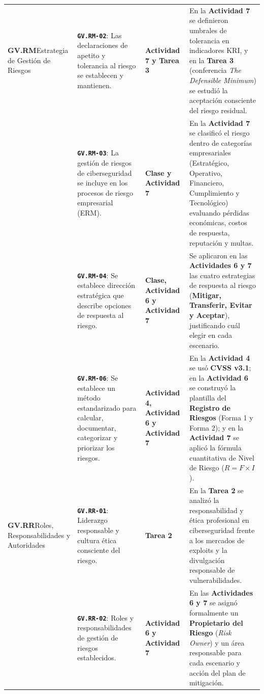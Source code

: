 \documentclass[letterpaper,11pt]{article}
\begin{document}
\begin{longtable}{|L{2.8cm}|L{4.5cm}|L{2.9cm}|L{6.5cm}|}
\textbf{GV.RM}\newline Estrategia de Gestión de Riesgos &
\textbf{\texttt{GV.RM-02}}: Las declaraciones de apetito y tolerancia al riesgo se establecen y mantienen. &
\textbf{Actividad 7 y Tarea 3} &
En la \textbf{Actividad 7} se definieron umbrales de tolerancia en indicadores KRI, y en la \textbf{Tarea 3} (conferencia \textit{The Defensible Minimum}) se estudió la aceptación consciente del riesgo residual. \\
\nopagebreak
 &
\textbf{\texttt{GV.RM-03}}: La gestión de riesgos de ciberseguridad se incluye en los procesos de riesgo empresarial (ERM). &
\textbf{Clase y Actividad 7} &
En la \textbf{Actividad 7} se clasificó el riesgo dentro de categorías empresariales (Estratégico, Operativo, Financiero, Cumplimiento y Tecnológico) evaluando pérdidas económicas, costos de respuesta, reputación y multas. \\
\nopagebreak
 &
\textbf{\texttt{GV.RM-04}}: Se establece dirección estratégica que describe opciones de respuesta al riesgo. &
\textbf{Clase, Actividad 6 y Actividad 7} &
Se aplicaron en las \textbf{Actividades 6 y 7} las cuatro estrategias de respuesta al riesgo (\textbf{Mitigar, Transferir, Evitar y Aceptar}), justificando cuál elegir en cada escenario. \\
\nopagebreak
 &
\textbf{\texttt{GV.RM-06}}: Se establece un método estandarizado para calcular, documentar, categorizar y priorizar los riesgos. &
\textbf{Actividad 4, Actividad 6 y Actividad 7} &
En la \textbf{Actividad 4} se usó \textbf{CVSS v3.1}; en la \textbf{Actividad 6} se construyó la plantilla del \textbf{Registro de Riesgos} (Forma 1 y Forma 2); y en la \textbf{Actividad 7} se aplicó la fórmula cuantitativa de Nivel de Riesgo ($R = F \times I$). \\
\hline

\textbf{GV.RR}\newline Roles, Responsabilidades y Autoridades &
\textbf{\texttt{GV.RR-01}}: Liderazgo responsable y cultura ética consciente del riesgo. &
\textbf{Tarea 2} &
En la \textbf{Tarea 2} se analizó la responsabilidad y ética profesional en ciberseguridad frente a los mercados de exploits y la divulgación responsable de vulnerabilidades. \\
\nopagebreak
 &
\textbf{\texttt{GV.RR-02}}: Roles y responsabilidades de gestión de riesgos establecidos. &
\textbf{Actividad 6 y Actividad 7} &
En las \textbf{Actividades 6 y 7} se asignó formalmente un \textbf{Propietario del Riesgo} (\textit{Risk Owner}) y un área responsable para cada escenario y acción del plan de mitigación. \\
\hline


\end{longtable}
\end{document}
